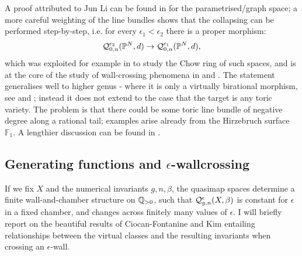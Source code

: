 \begin{rmk}
 A proof attributed to Jun Li can be found in \cite[Lemma 2.6]{LLY1} for the parametrised/graph space; a more careful weighting of the line bundles shows that the collapsing can be performed step-by-step, i.e. for every $\epsilon_1<\epsilon_2$ there is a proper morphism:
 \[ \mathcal{Q}^{\epsilon_2}_{0,n}(\mathbb P^N,d) \rightarrow \mathcal{Q}^{\epsilon_1}_{0,n}(\mathbb P^N,d),\] which was exploited for example in \cite{Mustata} to study the Chow ring of such spaces, and is at the core of the study of wall-crossing phenomena in \cite{TodaStableQuotient} and \cite{CF-K-wallcrossing}. The statement generalises well to higher genus - where it is only a virtually birational morphism, see \cite[Theorem 3]{MOP} and \cite[Proposition 4.21]{Manolache-Push}; instead it does not extend to the case that the target is any toric variety. The problem is that there could be some toric line bundle of negative degree along a rational tail; examples arise already from the Hirzebruch surface $\mathbb F_1$. A lengthier discussion can be found in \cite[Appendix A]{BN}.
\end{rmk}

\subsection{Generating functions and $\epsilon$-wallcrossing}\label{subsec:gf_and_wc} If we fix $X$ and the numerical invariants $g,n,\beta$, the quasimap spaces determine a finite wall-and-chamber structure on $\mathbb{Q}_{>0}$, such that $\mathcal{Q}^{\epsilon}_{g,n}(X,\beta)$ is constant for $\epsilon$ in a fixed chamber, and changes across finitely many values of $\epsilon$. I will briefly report on the beautiful results of Ciocan-Fontanine and Kim \cites{CF-K-wallcrossing,CF-K-higher-genus,CF-K-MirrorSymmetry} entailing relationships between the virtual classes and the resulting invariants when crossing an $\epsilon$-wall.

